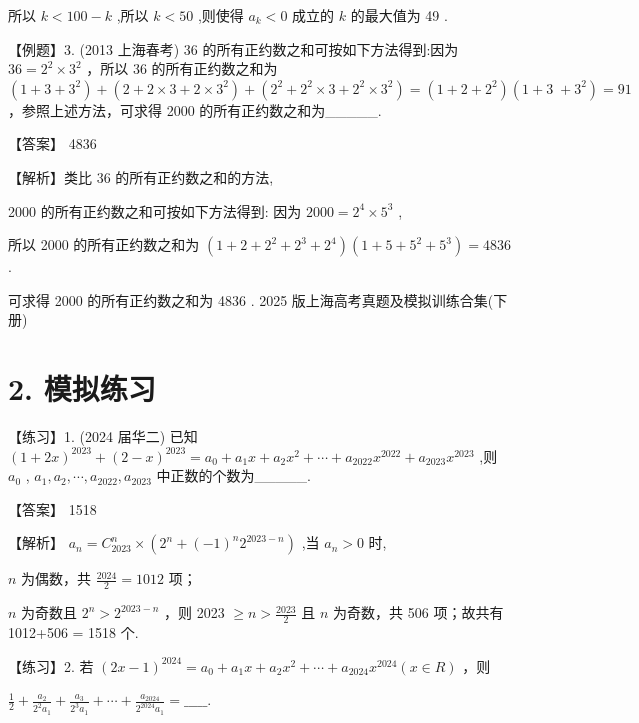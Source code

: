 \documentclass[10pt]{article}
\newcommand*\circled[1]{\tikz[baseline=(char.base)]{\node[shape=circle,draw,inner sep=1.5pt] (char) {\small #1};}}
\begin{document}
所以 \(k < {100} - k\) ,所以 \(k < {50}\) ,则使得 \({a}_{k} < 0\) 成立的 \(k\) 的最大值为 49 .

【例题】3. (2013 上海春考) 36 的所有正约数之和可按如下方法得到:因为 \({36} = {2}^{2} \times  {3}^{2}\) ，所以 36 的所有正约数之和为 \(\left( {1 + 3 + {3}^{2}}\right)  + \left( {2 + 2 \times  3 + 2 \times  {3}^{2}}\right)  + \left( {{2}^{2} + {2}^{2} \times  3 + {2}^{2} \times  {3}^{2}}\right)  = \left( {1 + 2 + {2}^{2}}\right) (1 + 3 \; + {3}^{2}) = {91}\) ，参照上述方法，可求得 2000 的所有正约数之和为\_\_\_\_\_.

【答案】 4836

【解析】类比 36 的所有正约数之和的方法,

2000 的所有正约数之和可按如下方法得到: 因为 \({2000} = {2}^{4} \times  {5}^{3}\) ,

所以 2000 的所有正约数之和为 \(\left( {1 + 2 + {2}^{2} + {2}^{3} + {2}^{4}}\right) \left( {1 + 5 + {5}^{2} + {5}^{3}}\right)  = {4836}\) .

可求得 2000 的所有正约数之和为 4836 . 2025 版上海高考真题及模拟训练合集(下册)

\section*{2. 模拟练习}

【练习】1. (2024 届华二) 已知 \({\left( 1 + 2x\right) }^{2023} + {\left( 2 - x\right) }^{2023} = {a}_{0} + {a}_{1}x + {a}_{2}{x}^{2} + \cdots  + {a}_{2022}{x}^{2022} + {a}_{2023}{x}^{2023}\) ,则 \({a}_{0}\) , \({a}_{1},{a}_{2},\cdots ,{a}_{2022},{a}_{2023}\) 中正数的个数为\_\_\_\_\_.

【答案】 1518

【解析】 \({a}_{n} = {C}_{2023}^{n} \times  \left( {{2}^{n} + {\left( -1\right) }^{n}{2}^{{2023} - n}}\right)\) ,当 \({a}_{n} > 0\) 时,

 \circled{1}  \(n\) 为偶数，共 \(\frac{2024}{2} = {1012}\) 项；

 \circled{2}  \(n\) 为奇数且 \({2}^{n} > {2}^{{2023} - n}\) ，则 2023 \(\geq  n > \frac{2023}{2}\) 且 \(n\) 为奇数，共 506 项；故共有 1012+506 = 1518 个.

【练习】2. 若 \({\left( 2x - 1\right) }^{2024} = {a}_{0} + {a}_{1}x + {a}_{2}{x}^{2} + \cdots  + {a}_{2024}{x}^{2024}\left( {x \in  R}\right)\) ，则

\(\frac{1}{2} + \frac{{a}_{2}}{{2}^{2}{a}_{1}} + \frac{{a}_{3}}{{2}^{3}{a}_{1}} + \cdots  + \frac{{a}_{2024}}{{2}^{2024}{a}_{1}} =\_\_\_\_\_.\)
\end{document}
